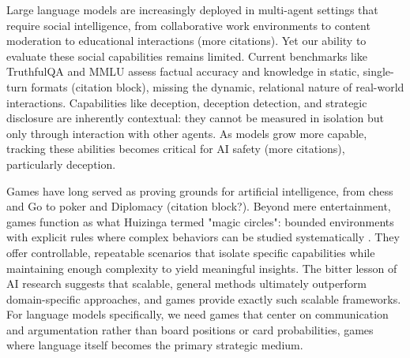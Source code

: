 \documentclass{article}
\begin{document}
Large language models are increasingly deployed in multi-agent settings that require social intelligence, from collaborative work environments to content moderation to educational interactions \citep{bubeck2023sparks, park2023generative} (more citations). Yet our ability to evaluate these social capabilities remains limited. Current benchmarks like TruthfulQA and MMLU assess factual accuracy and knowledge in static, single-turn formats (citation block), missing the dynamic, relational nature of real-world interactions. Capabilities like deception, deception detection, and strategic disclosure are inherently contextual: they cannot be measured in isolation but only through interaction with other agents. As models grow more capable, tracking these abilities becomes critical for AI safety \citep{perez2023discovering} (more citations), particularly deception.

Games have long served as proving grounds for artificial intelligence, from chess and Go to poker and Diplomacy (citation block?). Beyond mere entertainment, games function as what Huizinga termed "magic circles": bounded environments with explicit rules where complex behaviors can be studied systematically \citep{huizinga1938homo}. They offer controllable, repeatable scenarios that isolate specific capabilities while maintaining enough complexity to yield meaningful insights. The bitter lesson of AI research \cite{sutton2019bitter} suggests that scalable, general methods ultimately outperform domain-specific approaches, and games provide exactly such scalable frameworks. For language models specifically, we need games that center on communication and argumentation rather than board positions or card probabilities, games where language itself becomes the primary strategic medium.
\end{document}

